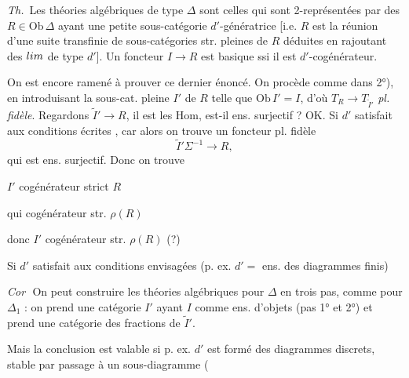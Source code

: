 \documentclass[11pt,a4paper]{article}
\begin{document}
\emph{Th.}\ Les théories algébriques de type $\Delta$ sont celles
qui sont 2-représentées par des $R \in \mathrm{Ob}\,\Delta$ ayant une
petite sous-catégorie   $d'$-génératrice [i.e.
 $R$ est la réunion d'une suite transfinie de
sous-catégories str. pleines de $R$ déduites en rajoutant des
$\varprojlim$ de type $d'$]. Un foncteur $I \to R$ 
est basique ssi il est $d'$-cogénérateur.

On est encore ramené à prouver ce dernier énoncé. On procède comme dans
2°), en introduisant la sous-cat. pleine $I'$ de $R$ telle que
$\mathrm{Ob}\,I' = I$, d'où $T_{R} \to T_{\tilde{I}'}$ \emph{pl.
fidèle}. Regardons $\tilde{I}' \to R$, il est   les Hom, \struck{\ill{}} est-il ens.
surjectif ? OK. Si  $d'$ \struck{\ill{}} satisfait
aux conditions écrites , car alors on trouve un
\supplied{$\Delta$-}foncteur pl. fidèle
\[
  \tilde{I}'\Sigma^{-1} \longrightarrow R,
\]
 \struck{\ill{}} qui  est ens. surjectif. Donc
on trouve


$I'$ cogénérateur strict $R$ 

qui cogénérateur str. $\rho(R)$ 

donc $I'$ cogénérateur str. $\rho(R)$ (?)

Si $d'$ satisfait aux conditions envisagées (p. ex. $d' =$ ens. des
diagrammes finis)

\emph{Cor\,}\ On peut construire les théories
algébriques pour $\Delta$ en trois pas, comme pour $\Delta_{1}$ : on
prend une catégorie $I'$ ayant $I$ comme ens. d'objets (pas 1° et 2°) et
prend une catégorie des fractions de $\tilde{I}'$.

 Mais la conclusion est
valable si p. ex. $d'$ est formé des diagrammes discrets, stable par
passage à un sous-diagramme ( \struck{\ill{}}
\end{document}
